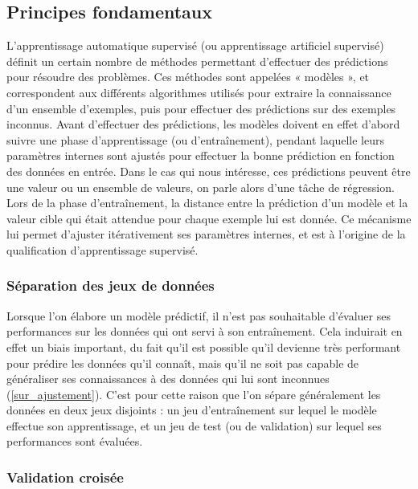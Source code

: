 \label{apprentissage_auto}

\subsection{Principes fondamentaux}

\label{apprentissage_automatique_principes}

L'apprentissage automatique supervisé (ou apprentissage artificiel supervisé) définit un certain nombre de méthodes permettant d'effectuer des prédictions pour résoudre des problèmes. Ces méthodes sont appelées « modèles », et correspondent aux différents algorithmes utilisés pour extraire la connaissance d'un ensemble d'exemples, puis pour effectuer des prédictions sur des exemples inconnus. Avant d'effectuer des prédictions, les modèles doivent en effet d'abord suivre une phase d'apprentissage (ou d'entraînement), pendant laquelle leurs paramètres internes sont ajustés pour effectuer la bonne prédiction en fonction des données en entrée. Dans le cas qui nous intéresse, ces prédictions peuvent être une valeur ou un ensemble de valeurs, on parle alors d'une tâche de régression. Lors de la phase d'entraînement, la distance entre la prédiction d'un modèle et la valeur cible qui était attendue pour chaque exemple lui est donnée. Ce mécanisme lui permet d'ajuster itérativement ses paramètres internes, et est à l'origine de la qualification d'apprentissage supervisé.


\subsubsection{Séparation des jeux de données}

\label{apprentissage_automatique_separation_jeux}

\par Lorsque l'on élabore un modèle prédictif, il n'est pas souhaitable d'évaluer ses performances sur les données qui ont servi à son entraînement. Cela induirait en effet un biais important, du fait qu'il est possible qu'il devienne très performant pour prédire les données qu'il connaît, mais qu'il ne soit pas capable de généraliser ses connaissances à des données qui lui sont inconnues (\ref{sur_ajustement}). C'est pour cette raison que l'on sépare généralement les données en deux jeux disjoints : un jeu d'entraînement sur lequel le modèle effectue son apprentissage, et un jeu de test (ou de validation) sur lequel ses performances sont évaluées.

\subsubsection{Validation croisée}

